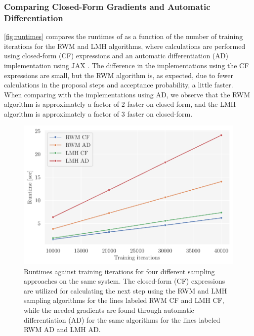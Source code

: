 \FloatBarrier

\subsubsection*{Comparing Closed-Form Gradients and Automatic Differentiation}

\autoref{fig:runtimes} compares the runtimes of as a function of the number of training iterations for the RWM and LMH algorithms, where calculations are performed using closed-form (CF) expressions and an automatic differentiation (AD) implementation using JAX \citep{jax2018github}. The difference in the implementations using the CF expressions are small, but the RWM algorithm is, as expected, due to fewer calculations in the proposal steps and acceptance probability, a little faster. When comparing with the implementations using AD, we observe that the RWM algorithm is approximately a factor of $2$ faster on closed-form, and the LMH algorithm is approximately a factor of $3$ faster on closed-form. 

\begin{figure}[!htb]
\begin{center}\includegraphics[scale=0.8]{latex/figures/runtimes.pdf}
\end{center}
\caption{Runtimes against training iterations for four different sampling approaches on the same system. The closed-form (CF) expressions are utilized for calculating the next step using the RWM and LMH sampling algorithms for the lines labeled RWM CF and LMH CF, while the needed gradients are found through automatic differentiation (AD) for the same algorithms for the lines labeled RWM AD and LMH AD.}
\label{fig:runtimes}
\end{figure}


